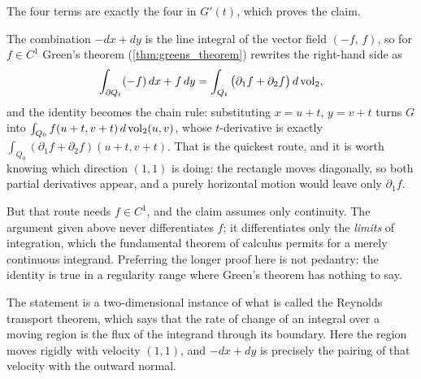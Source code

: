 \begin{example}
The four terms are exactly the four in $G'(t)$, which proves the claim.

\begin{remark}
The combination $-dx + dy$ is the line integral of the vector field $(-f,\,f)$, so for $f \in C^1$
Green's theorem (\cref{thm:greens_theorem}) rewrites the right-hand side as
\[\int_{\partial Q_t} (-f)\,dx + f\,dy = \int_{Q_t}\big(\partial_1 f + \partial_2 f\big)\,d\operatorname{vol}_2,\]
and the identity becomes the chain rule: substituting $x = u+t$, $y = v+t$ turns $G$ into
$\int_{Q_0} f(u+t,v+t)\,d\operatorname{vol}_2(u,v)$, whose $t$-derivative is exactly
$\int_{Q_0}(\partial_1f+\partial_2f)(u+t,v+t)$. That is the quickest route, and it is worth
knowing which direction $(1,1)$ is doing: the rectangle moves diagonally, so both partial
derivatives appear, and a purely horizontal motion would leave only $\partial_1 f$.

But that route needs $f \in C^1$, and the claim assumes only continuity. The argument given above
never differentiates $f$; it differentiates only the \emph{limits} of integration, which the
fundamental theorem of calculus permits for a merely continuous integrand. Preferring the longer
proof here is not pedantry: the identity is true in a regularity range where Green's theorem has
nothing to say.

The statement is a two-dimensional instance of what is called the Reynolds transport theorem, which
says that the rate of change of an integral over a moving region is the flux of the integrand
through its boundary. Here the region moves rigidly with velocity $(1,1)$, and $-dx+dy$ is
precisely the pairing of that velocity with the outward normal.
\end{remark}
\end{example}
